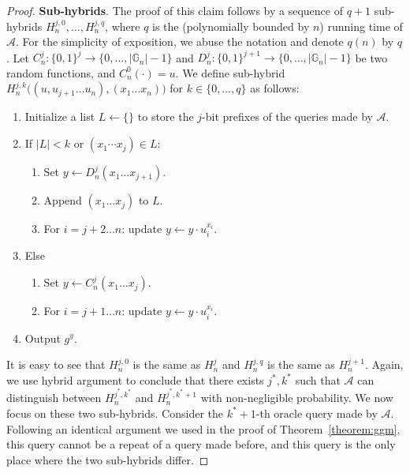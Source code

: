 \begin{proof}
    \noindent \textbf{Sub-hybrids}. The proof of this claim follows by a sequence of $q+1$ sub-hybrids $H_n^{j, 0}, \dots, H_n^{j, q}$, where $q$ is the (polynomially bounded by $n$) running time of $\mathcal{A}$. For the simplicity of exposition, we abuse the notation and denote $q(n)$ by $q$. Let $C_n^j: \{0, 1\}^j \to \{0, \dots, |\mathbb{G}_n|-1\}$ and $D_n^j: \{0, 1\}^{j+1} \to \{0, \dots, |\mathbb{G}_n|-1\}$ be two random functions, and $C_n^0(\cdot) = u$. We define sub-hybrid $H_n^{j, k}\big((u, u_{j+1}\ldots u_n),(x_1\dots x_n)\big)$ for $k \in \{0, \dots, q\}$ as follows:
    \begin{enumerate}
        \item Initialize a list $L \gets \{\}$ to store the $j$-bit prefixes of the queries made by $\mathcal{A}$.
        \item If $|L|<k$ or $(x_1\cdots x_j) \in L$:
              \begin{enumerate}
                  \item Set $y \gets D^j_n(x_1\dots x_{j+1})$.
                  \item Append $(x_1\dots x_j)$ to $L$.
                  \item For $i = j+2 \dots n$: update $y \gets y \cdot u_i^{x_i}$.
              \end{enumerate}
        \item Else
              \begin{enumerate}
                  \item Set $y \gets C^j_n(x_1\dots x_j)$.
                  \item For $i = j+1 \dots n$: update $y \gets y \cdot u_i^{x_i}$.
              \end{enumerate}
        \item Output $g^y$.
    \end{enumerate}

    It is easy to see that $H_n^{j, 0}$ is the same as $H_n^j$ and $H_n^{j, q}$ is the same as $H_n^{j+1}$.
    Again, we use hybrid argument to conclude that there exists $j^*, k^*$ such that $\mathcal{A}$ can distinguish between $H_n^{j^*, k^*}$ and $H_n^{j^*, k^*+1}$ with non-negligible probability. We now focus on these two sub-hybrids. Consider the $k^*+1$-th oracle query made by $\mathcal{A}$. Following an identical argument we used in the proof of Theorem~\ref{theorem:ggm}, this query cannot be a repeat of a query made before, and this query is the only place where the two sub-hybrids differ.\smallskip


\end{proof}
